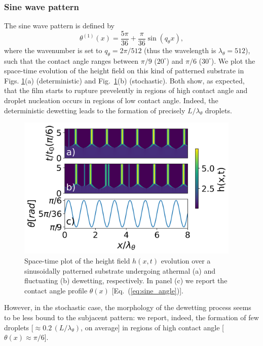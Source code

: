 \subsubsection{Sine wave pattern}\label{subsubsec:sine}
The sine wave pattern is defined by
\begin{equation}\label{eq:sine_angle}
    {\theta^{(1)}}(x) = \frac{5\pi}{36} + \frac{\pi}{36} \sin\left(q_{\theta} x\right),
\end{equation}
where the wavenumber is set to $q_{\theta} = 2\pi/512$ (thus the wavelength is $\lambda_{\theta}=512$), such that the contact angle ranges between $\pi/9$ ($20^{\circ}$) and $\pi/6$ ($30^{\circ}$).
We plot the space-time evolution of the height field on this kind of patterned substrate in Figs. \ref{fig:patterned_sine8_difference_20-30}(a) (deterministic) and  Fig.~\ref{fig:patterned_sine8_difference_20-30}(b) (stochastic). 
Both show, as expected, that the film starts to rupture prevelently in regions of high contact angle and droplet nucleation occurs in regions of low contact angle. 
Indeed, the deterministic dewetting leads to the formation of precisely $L/\lambda_{\theta}$ droplets.
\begin{figure}
    \centering
    \includegraphics[width=0.95\textwidth]{graphics/spacedepCA_['sine', '1e7', '10', 25, '9_3', 10000000.0]_v2.png}
    \caption{Space-time plot of the height field $h(x,t)$ evolution over a sinusoidally patterned substrate undergoing athermal 
    (a) and fluctuating (b) dewetting, respectively. In panel (c) we report the contact angle profile $\theta(x)$ [Eq.~(\ref{eq:sine_angle})].} 
    \label{fig:patterned_sine8_difference_20-30}
\end{figure}
However, in the stochastic case, the morphology of the dewetting process seems to be less bound to the subjacent pattern: we report, indeed, the formation of few droplets [$\approx 0.2 \, (L/\lambda_{\theta})$, on average] in regions of high contact angle [$\theta(x) \approx \pi/6$].

